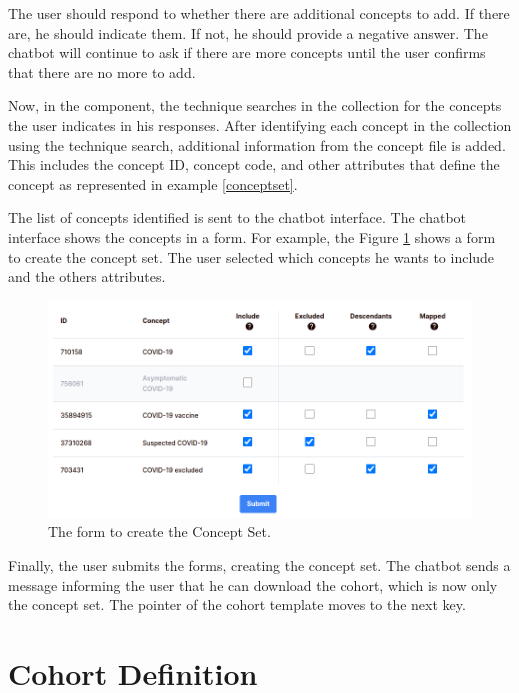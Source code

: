 The user should respond to whether there are additional concepts to add. If there are, he should indicate them. If not, he should provide a negative answer. The chatbot will continue to ask if there are more concepts until the user confirms that there are no more to add.

Now, in the {\ir} component, the {\bm} technique searches in the collection for the concepts the user indicates in his responses. After identifying each concept in the collection using the {\ir} technique search, additional information from the concept file is added. This includes the concept ID, concept code, and other attributes that define the concept as represented in example \ref{conceptset}.

The list of concepts identified is sent to the chatbot interface. The chatbot interface shows the concepts in a form. For example, the Figure \ref{fig_forms} shows a form to create the concept set. The user selected which concepts he wants to include and the others attributes.

\begin{figure}[H]
  \includegraphics[width=1\textwidth]{figs/chapter4/form.png}
  \centering
  \caption{The form to create the Concept Set.}
  \label{fig_forms}
\end{figure}

Finally, the user submits the forms, creating the concept set. The chatbot sends a message informing the user that he can download the cohort, which is now only the concept set. The pointer of the cohort template moves to the next key.



\section{Cohort Definition}

